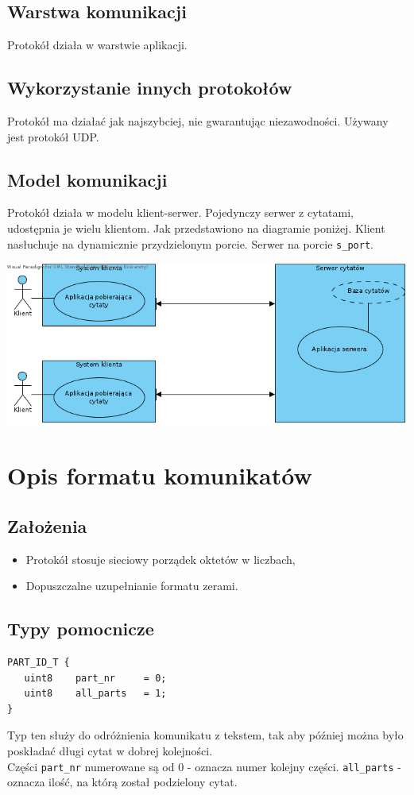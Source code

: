 \documentclass{article}
\begin{document}
\subsection{Warstwa komunikacji}
Protokół działa w warstwie aplikacji.
\subsection{Wykorzystanie innych protokołów}
Protokół ma działać jak najszybciej, nie gwarantując niezawodności. Używany jest protokół UDP.
\subsection{Model komunikacji}
Protokół działa w modelu klient-serwer. Pojedynczy serwer z cytatami, udostępnia je wielu klientom.
Jak przedstawiono na diagramie poniżej.
Klient nasłuchuje na dynamicznie przydzielonym porcie. Serwer na porcie \verb+s_port+.
\begin{center}
\includegraphics[scale=0.7]{model.png}
\end{center}

\section{Opis formatu komunikatów}
\subsection{Założenia}
\begin{itemize}
\item Protokół stosuje sieciowy porządek oktetów w liczbach,
\item Dopuszczalne uzupełnianie formatu zerami. 
\end{itemize}
\subsection{Typy pomocnicze}
\begin{verbatim}
PART_ID_T {
   uint8    part_nr     = 0;
   uint8    all_parts   = 1;
}
\end{verbatim}
Typ ten służy do odróżnienia komunikatu z tekstem, tak aby później można było poskładać długi cytat w dobrej kolejności.\\
Części \verb+part_nr+ numerowane są od $0$ - oznacza numer kolejny części. \verb+all_parts+ - oznacza ilość, na którą został
podzielony cytat.
\end{document}
